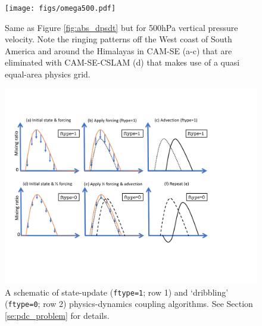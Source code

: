 \documentclass{agujournal}
\begin{document}
 \begin{figure}
 \centering
 \texttt{[image: figs/omega500.pdf]}
 \caption{Same as Figure \ref{fig:abs_dpsdt} but for 500hPa vertical pressure velocity. Note the ringing patterns off the West coast of South America and around the Himalayas in CAM-SE (a-c) that are eliminated with CAM-SE-CSLAM (d) that makes use of a quasi equal-area physics grid.}
 \label{fig:omega500}
  \end{figure}

 \begin{figure}[h]
 \centering
 \includegraphics[width=35pc]{figs/ftype_schematic.pdf}
 \caption{A schematic of state-update ({\tt{ftype=1}}; row 1) and `dribbling' ({\tt{ftype=0}}; row 2) physics-dynamics coupling algorithms. See Section \ref{se:pdc_problem} for details.}
 \label{fig:ftype_schematic}
  \end{figure}
\end{document}
